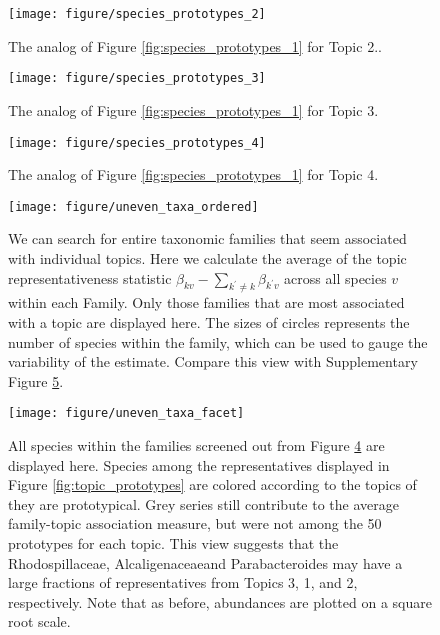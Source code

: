 \documentclass[oupdraft]{bio}
\begin{document}
\begin{figure}[!p]
  \centering
  \texttt{[image: figure/species\_prototypes\_2]}
  \caption{The analog of Figure \ref{fig:species_prototypes_1} for Topic
    2.\label{fig:species_prototypes_2}. }
\end{figure}

\begin{figure}[!p]
  \centering
  \texttt{[image: figure/species\_prototypes\_3]}
  \caption{The analog of Figure \ref{fig:species_prototypes_1} for Topic
    3. \label{fig:species_prototypes_3} }
\end{figure}

\begin{figure}[!p]
  \centering
  \texttt{[image: figure/species\_prototypes\_4]}
  \caption{The analog of Figure \ref{fig:species_prototypes_1} for Topic
    4. \label{fig:species_prototypes_4} }
\end{figure}


\begin{figure}[!p]
  \centering
  \texttt{[image: figure/uneven\_taxa\_ordered]}
  \caption{We can search for entire taxonomic families that seem associated with
    individual topics. Here we calculate the average of the topic
    representativeness statistic $\beta_{kv} - \sum_{k^{\prime} \neq k}
    \beta_{k^{\prime} v}$ across all species $v$ within each
    Family. Only those families that are most associated with a topic are
    displayed here. The sizes of circles represents the number of species within
    the family, which can be used to gauge the variability of the
    estimate. Compare this view with Supplementary Figure
    \ref{fig:uneven_taxa_facet}. \label{fig:uneven_taxa_ordered} }
\end{figure}

\begin{figure}[!p]
  \centering
  \texttt{[image: figure/uneven\_taxa\_facet]}
  \caption{All species within the families screened out from Figure
    \ref{fig:uneven_taxa_ordered} are displayed here. Species among the
    representatives displayed in Figure \ref{fig:topic_prototypes} are colored
    according to the topics of they are prototypical. Grey series still
    contribute to the average family-topic association measure, but were not
    among the 50 prototypes for each topic. This view suggests that the
    Rhodospillaceae, Alcaligenaceaeand Parabacteroides may have a large
    fractions of representatives from Topics 3, 1, and 2, respectively. Note
    that as before, abundances are plotted on a square root
    scale. \label{fig:uneven_taxa_facet} }
\end{figure}
\end{document}
